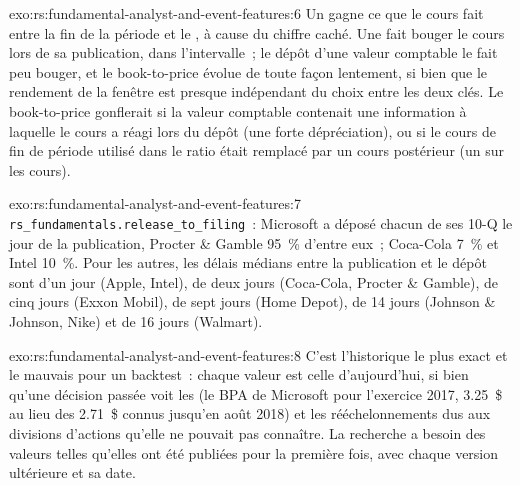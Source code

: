 \begin{solution}{exo:rs:fundamental-analyst-and-event-features:6}
Un  gagne ce que le cours fait entre la fin de la période et le , à cause du chiffre caché. Une  fait bouger le
cours lors de sa publication, dans l'intervalle~; le dépôt d'une valeur comptable le fait peu bouger, et le book-to-price évolue de toute façon lentement, si bien que le rendement de la fenêtre est
presque indépendant du choix entre les deux clés. Le book-to-price gonflerait si la valeur comptable contenait une information à laquelle le cours a réagi lors du dépôt
(une forte dépréciation), ou si le cours de fin de période utilisé dans le ratio était remplacé par un cours postérieur (un  sur les cours).
\end{solution}

\begin{solution}{exo:rs:fundamental-analyst-and-event-features:7}
\texttt{rs\_fundamentals.release\_to\_filing}~: Microsoft a déposé chacun de ses 10-Q le jour de la publication, Procter \& Gamble 95~\% d'entre eux~; Coca-Cola 7~\% et
Intel 10~\%. Pour les autres, les délais médians entre la publication et le dépôt sont d'un jour (Apple, Intel), de deux jours (Coca-Cola, Procter \& Gamble), de cinq jours (Exxon Mobil),
de sept jours (Home Depot), de 14 jours (Johnson \& Johnson, Nike) et de 16 jours (Walmart).
\end{solution}

\begin{solution}{exo:rs:fundamental-analyst-and-event-features:8}
C'est l'historique le plus exact et le mauvais pour un backtest~: chaque valeur est celle d'aujourd'hui, si bien qu'une décision passée voit les  (le
BPA de Microsoft pour l'exercice 2017, 3.25~\$ au lieu des 2.71~\$ connus jusqu'en août 2018) et les rééchelonnements dus aux divisions d'actions qu'elle ne pouvait pas connaître. La recherche a besoin des valeurs telles
qu'elles ont été publiées pour la première fois, avec chaque version ultérieure et sa date.
\end{solution}

